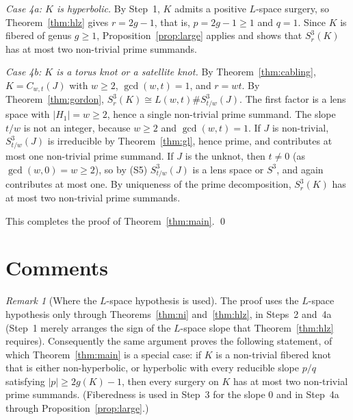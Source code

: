 \documentclass[11pt]{article}
\newcommand{\Surg}[2]{S^3_{#1}(#2)}
\theoremstyle{definition}
\theoremstyle{remark}
\newtheorem{remark}[theorem]{Remark}
\begin{document}
\emph{Case 4a: \(K\) is hyperbolic.} By Step~1, \(K\) admits a positive
\(L\)-space surgery, so Theorem~\ref{thm:hlz} gives \(r=2g-1\), that is,
\(p=2g-1\geq1\) and \(q=1\). Since \(K\) is fibered of genus \(g\geq1\),
Proposition~\ref{prop:large} applies and shows that \(\Surg{r}{K}\) has at
most two non-trivial prime summands.

\emph{Case 4b: \(K\) is a torus knot or a satellite knot.} By
Theorem~\ref{thm:cabling}, \(K=C_{w,t}(J)\) with \(w\geq2\),
\(\gcd(w,t)=1\), and \(r=wt\). By Theorem~\ref{thm:gordon},
\(\Surg{r}{K}\cong L(w,t)\#\Surg{t/w}{J}\). The first factor is a lens
space with \(|H_1|=w\geq2\), hence a single non-trivial prime summand.
The slope \(t/w\) is not an integer, because \(w\geq2\) and
\(\gcd(w,t)=1\). If \(J\) is non-trivial, \(\Surg{t/w}{J}\) is irreducible
by Theorem~\ref{thm:gl}, hence prime, and contributes at most one
non-trivial prime summand. If \(J\) is the unknot, then \(t\neq0\) (as
\(\gcd(w,0)=w\geq2\)), so by (S5) \(\Surg{t/w}{J}\) is a lens space or
\(S^3\), and again contributes at most one. By uniqueness of the prime
decomposition, \(\Surg{r}{K}\) has at most two non-trivial prime
summands.

This completes the proof of Theorem~\ref{thm:main}. \qed

\section{Comments}\label{sec:comments}

\begin{remark}[Where the \(L\)-space hypothesis is used]
The proof uses the \(L\)-space hypothesis only through
Theorems~\ref{thm:ni} and~\ref{thm:hlz}, in Steps~2 and~4a (Step~1
merely arranges the sign of the \(L\)-space slope that
Theorem~\ref{thm:hlz} requires). Consequently the same argument proves
the following statement, of which Theorem~\ref{thm:main} is a special
case: if \(K\) is a non-trivial fibered knot that is either
non-hyperbolic, or hyperbolic with every reducible slope \(p/q\)
satisfying \(|p|\geq2g(K)-1\), then every surgery on \(K\) has at most
two non-trivial prime summands. (Fiberedness is used in Step~3 for the
slope \(0\) and in Step~4a through Proposition~\ref{prop:large}.)
\end{remark}
\end{document}
